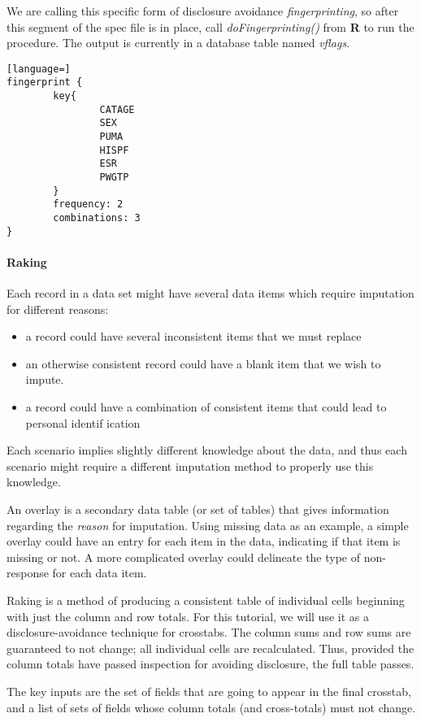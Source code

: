 \documentclass{article}
\begin{document}
We are calling this specific form of disclosure avoidance {\em fingerprinting}, so after
this segment of the spec file is in place, call {\em doFingerprinting()} from \textbf{R} to run the
procedure. The output is currently in a database table named {\em vflags}.

\begin{lstlisting}[language=]
fingerprint {
        key{
                CATAGE
                SEX
                PUMA
                HISPF
                ESR
                PWGTP
        }
        frequency: 2
        combinations: 3
}
\end{lstlisting}

\paragraph{Raking} Each record in a data set might have several data items which require imputation for
different reasons:
\begin{itemize}
\item a record could have several inconsistent items that we must replace
\item an otherwise consistent record could have a blank item that we wish to impute.
\item a record could have a combination of consistent items that could lead to personal identif
ication
\end{itemize}
Each scenario implies slightly different knowledge about the data, and thus each scenario
might require a different imputation method to properly use this knowledge.

An overlay is a secondary data table (or set of tables) that gives information regarding
the \emph{reason} for imputation.  Using missing data as an example, a simple overlay
could have an entry for each item in the data, indicating if that item is missing or not.
A more complicated overlay could delineate the type of non-response for each data item.

Raking is a method of producing a consistent table of individual cells beginning
with just the column and row totals. For this tutorial, we will use it as a
disclosure-avoidance technique for crosstabs. The column sums
and row sums are guaranteed to not change; all individual cells are
recalculated. Thus, provided the column totals have passed inspection for
avoiding disclosure, the full table passes.

The key inputs are the set of fields that are going to appear in the final
crosstab, and a list of sets of fields whose column totals (and cross-totals)
must not change.
\end{document}
